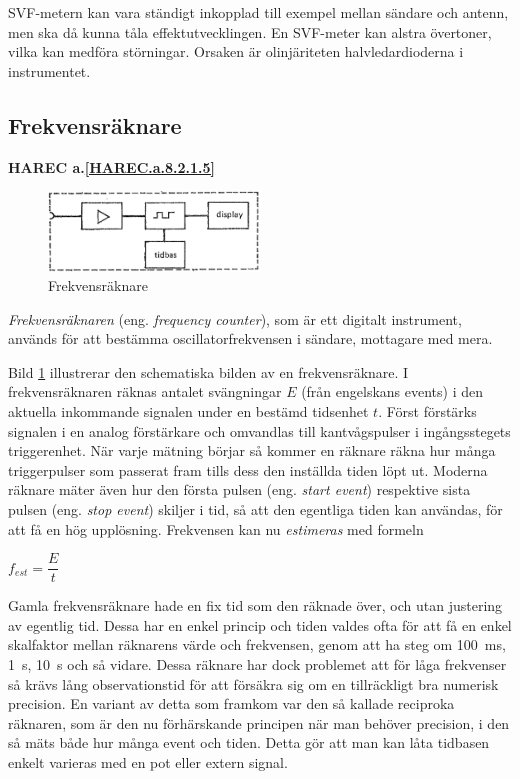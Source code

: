 SVF-metern kan vara ständigt inkopplad till exempel mellan sändare och antenn, men
ska då kunna tåla effektutvecklingen.
En SVF-meter kan alstra övertoner, vilka kan medföra störningar.
Orsaken är olinjäriteten halvledardioderna i instrumentet.

\subsection{Frekvensräknare}
\textbf{
HAREC a.\ref{HAREC.a.8.2.1.5}\label{myHAREC.a.8.2.1.5}
}

\begin{figure}
  \includegraphics[width=0.5\textwidth]{images/cropped_pdfs/bild_2_8-10.pdf}
  \caption{Frekvensräknare}
  \label{fig:bildII8-10}
\end{figure}

\emph{Frekvensräknaren} (eng. \emph{frequency counter}), som är ett digitalt
instrument, används för att bestämma oscillatorfrekvensen i sändare,
mottagare med mera.

Bild \ref{fig:bildII8-10} illustrerar den schematiska bilden av en
frekvensräknare.
I frekvensräknaren räknas antalet svängningar \(E\) (från engelskans events)
i den aktuella inkommande signalen under en bestämd tidsenhet \(t\).
Först förstärks signalen i en analog förstärkare och omvandlas till
kantvågspulser i ingångsstegets triggerenhet.
När varje mätning börjar så kommer en räknare räkna hur många triggerpulser
som passerat fram tills dess den inställda tiden löpt ut.
Moderna räknare mäter även hur den första pulsen (eng. \emph{start event})
respektive sista pulsen (eng. \emph{stop event}) skiljer i tid, så att den
egentliga tiden kan användas, för att få en hög upplösning.
Frekvensen kan nu \emph{estimeras} med formeln

\(f_{est} = \dfrac{E}{t}\)

Gamla frekvensräknare hade en fix tid som den räknade över, och utan justering
av egentlig tid.
Dessa har en enkel princip och tiden valdes ofta för att få en enkel skalfaktor
mellan räknarens värde och frekvensen, genom att ha steg om 100~ms, 1~s, 10~s
och så vidare.
Dessa räknare har dock problemet att för låga frekvenser så krävs lång
observationstid för att försäkra sig om en tillräckligt bra numerisk precision.
En variant av detta som framkom var den så kallade reciproka räknaren, som är
den nu förhärskande principen när man behöver precision, i den så mäts både
hur många event och tiden.
Detta gör att man kan låta tidbasen enkelt varieras med en pot eller extern
signal.

